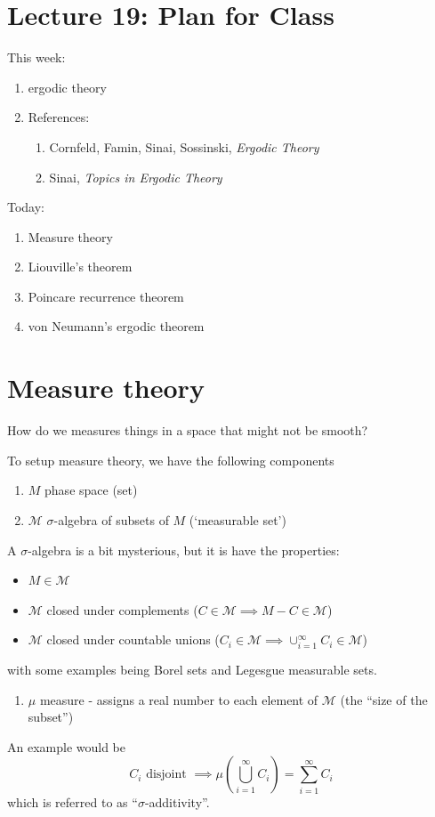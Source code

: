 \documentclass{article}
\begin{document}
\section{Lecture 19: Plan for Class}
This week:
\begin{enumerate}
    \item ergodic theory
    \item References: 
    \begin{enumerate}
        \item Cornfeld, Famin, Sinai, Sossinski, \textit{Ergodic Theory}
        \item Sinai, \textit{Topics in Ergodic Theory}
    \end{enumerate}
\end{enumerate}

Today:
\begin{enumerate}
    \item Measure theory
    \item Liouville's theorem 
    \item Poincare recurrence theorem 
    \item von Neumann's ergodic theorem
\end{enumerate}

\section{Measure theory}

How do we measures things in a space that might not be smooth?

To setup measure theory, we have the following components 
\begin{enumerate}
    \item $M$ phase space (set)
    \item $\mathcal{M}$ $\sigma$-algebra of subsets of $M$ (`measurable set')
\end{enumerate}
A $\sigma$-algebra is a bit mysterious, but it is have the properties:
\begin{itemize}
    \item $M\in \mathcal{M}$
    \item $\mathcal{M}$ closed under complements ($C\in \mathcal{M}\implies M-C\in\mathcal{M}$)
    \item $\mathcal{M}$ closed under countable unions ($C_i\in\mathcal{M}\implies \cup^\infty_{i=1}C_i\in\mathcal{M}$)
\end{itemize}
with some examples being Borel sets and Legesgue measurable sets.
\begin{enumerate}
    \item[(3)] $\mu$ measure - assigns a real number to each element of $\mathcal{M}$ (the ``size of the subset'')
\end{enumerate}
An example would be 
\[
C_i \text{  disjoint  }\implies \mu\left(\bigcup^\infty_{i=1}C_i\right)=\sum_{i=1}^{\infty}C_i
\]
which is referred to as ``$\sigma$-additivity''.
\end{document}
